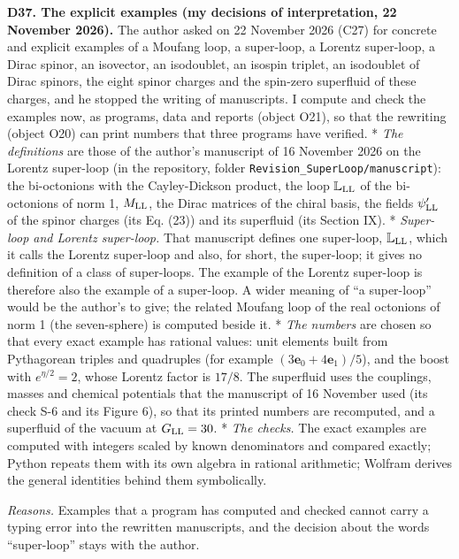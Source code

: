 \documentclass[
  10pt,
]{article}
\begin{document}
\textbf{D37. The explicit examples (my decisions of interpretation, 22
November 2026).} The author asked on 22 November 2026 (C27) for concrete
and explicit examples of a Moufang loop, a super-loop, a Lorentz
super-loop, a Dirac spinor, an isovector, an isodoublet, an isospin
triplet, an isodoublet of Dirac spinors, the eight spinor charges and
the spin-zero superfluid of these charges, and he stopped the writing of
manuscripts. I compute and check the examples now, as programs, data and
reports (object O21), so that the rewriting (object O20) can print
numbers that three programs have verified. * \emph{The definitions} are
those of the author's manuscript of 16 November 2026 on the Lorentz
super-loop (in the repository, folder
\texttt{Revision\_SuperLoop/manuscript}): the bi-octonions with the
Cayley-Dickson product, the loop \(\mathbb L_{\rm LL}\) of the
bi-octonions of norm 1, \(M_{\rm LL}\), the Dirac matrices of the chiral
basis, the fields \(\psi'_{\rm LL}\) of the spinor charges (its Eq.
(23)) and its superfluid (its Section IX). * \emph{Super-loop and
Lorentz super-loop.} That manuscript defines one super-loop,
\(\mathbb L_{\rm LL}\), which it calls the Lorentz super-loop and also,
for short, the super-loop; it gives no definition of a class of
super-loops. The example of the Lorentz super-loop is therefore also the
example of a super-loop. A wider meaning of ``a super-loop'' would be
the author's to give; the related Moufang loop of the real octonions of
norm 1 (the seven-sphere) is computed beside it. * \emph{The numbers}
are chosen so that every exact example has rational values: unit
elements built from Pythagorean triples and quadruples (for example
\((3\mathbf e_0+4\mathbf e_1)/5\)), and the boost with \(e^{\eta/2}=2\),
whose Lorentz factor is \(17/8\). The superfluid uses the couplings,
masses and chemical potentials that the manuscript of 16 November used
(its check S-6 and its Figure 6), so that its printed numbers are
recomputed, and a superfluid of the vacuum at \(G_{\rm LL}=30\). *
\emph{The checks.} The exact examples are computed with integers scaled
by known denominators and compared exactly; Python repeats them with its
own algebra in rational arithmetic; Wolfram derives the general
identities behind them symbolically.

\emph{Reasons.} Examples that a program has computed and checked cannot
carry a typing error into the rewritten manuscripts, and the decision
about the words ``super-loop'' stays with the author.
\end{document}
